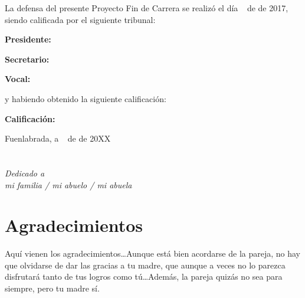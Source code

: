 \documentclass[a4paper, 12pt]{book}
\begin{document}
\vspace{1cm}
La defensa del presente Proyecto Fin de Carrera se realizó el día \qquad$\;\,$ de \qquad\qquad\qquad\qquad \newline de 2017, siendo calificada por el siguiente tribunal:


\vspace{0.5cm}
\textbf{Presidente:}

\vspace{1.2cm}
\textbf{Secretario:}

\vspace{1.2cm}
\textbf{Vocal:}


\vspace{1.2cm}
y habiendo obtenido la siguiente calificación:

\vspace{1cm}
\textbf{Calificación:}


\vspace{1cm}
\begin{flushright}
Fuenlabrada, a \qquad$\;\,$ de \qquad\qquad\qquad\qquad de 20XX
\end{flushright}


\chapter*{}
\begin{flushright}
\textit{Dedicado a \\
mi familia / mi abuelo / mi abuela}
\end{flushright}


\chapter*{Agradecimientos}

Aquí vienen los agradecimientos\ldots Aunque está bien acordarse de la pareja,
no hay que olvidarse de dar las gracias a tu madre, que aunque a veces no lo 
parezca disfrutará tanto de tus logros como tú\ldots Además, la pareja quizás
no sea para siempre, pero tu madre sí.
\end{document}
